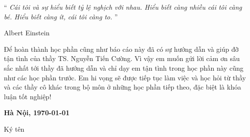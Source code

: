 \documentclass[
12pt,
oneside,
english,
doublespacing,
nolistspacing,
liststotoc,
parskip,
headsepline,
chapterinoneline,
]{MastersDoctoralThesis}
\begin{document}

\vspace*{0.2\textheight}

\noindent\enquote{\itshape 
	Cái tôi và sự hiểu biết tỷ lệ nghịch với nhau. Hiểu biết càng nhiều cái tôi càng bé. Hiểu biết càng ít, cái tôi càng to.
}\bigbreak

\hfill Albert Einstein



\begin{acknowledgements}
	\addchaptertocentry{\acknowledgementname}
	\thispagestyle{empty}
	Để hoàn thành học phần cũng như báo cáo này đã có sự hướng dẫn và giúp đỡ tận tình của thầy
	TS. Nguyễn Tiến Cường. Vì vậy em muốn gửi lời cảm ơn sâu sắc nhất tới thầy đã hướng dẫn và chỉ dạy
	em tận tình trong học phần này cũng như các học phần trước. Em hi vọng sẽ được tiếp tục làm việc và học hỏi từ thầy
	và các thầy cô khác trong bộ môn ở những học phần tiếp theo, đặc biệt là khóa luận tốt nghiệp!


	\vspace{1.5cm}
	\begin{flushright}
		\textbf{Hà Nội, \today}\\
	\end{flushright}
		\hspace{12cm}
		Ký tên \\
		\vspace{1cm}

		\hspace{10.5cm}
		\textbf{\authorname}\\



\end{acknowledgements}


%
\end{document}

